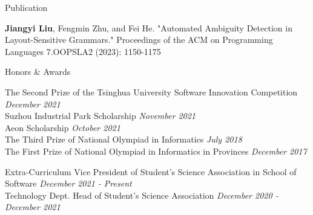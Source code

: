 \documentclass{resume} %
\newcommand{\Jul}{July }
\newcommand{\Oct}{October }
\newcommand{\Nov}{November }
\newcommand{\Dec}{December }
\begin{document}
\begin{rSection}{Publication}
  

  \textbf{Jiangyi Liu}, Fengmin Zhu, and Fei He. "Automated Ambiguity Detection in Layout-Sensitive Grammars." Proceedings of the ACM on Programming Languages 7.OOPSLA2 (2023): 1150-1175

 
    
\end{rSection}


\begin{rSection}{Honors \& Awards}

    The Second Prize of the Tsinghua University Software Innovation Competition \hfill {\em \Dec 2021}\\
    Suzhou Industrial Park Scholarship \hfill {\em \Nov 2021}\\
    Aeon Scholarship \hfill {\em \Oct 2021}\\
    The Third Prize of National Olympiad in Informatics \hfill {\em \Jul 2018}\\
    The First Prize of National Olympiad in Informatics in Provinces \hfill {\em \Dec 2017}\\

    
\end{rSection}

\begin{rSection}{Extra-Curriculum}
Vice President of Student's Science Association in School of Software \hfill {\em \Dec 2021 - Present}\\
Technology Dept. Head of Student's Science Association \hfill {\em \Dec 2020 - \Dec 2021}


\end{rSection}
\end{document}
